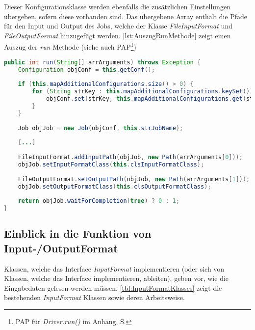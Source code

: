Dieser Konfigurationsklasse werden ebenfalls die zusätzlichen Einstellungen übergeben, sofern diese vorhanden sind. Das übergebene Array enthält die Pfade für den Input und Output des Jobs, welche der Klasse \textit{FileInputFormat} und \textit{FileOutputFormat} hinzugefügt werden. \autoref{lst:AuszugRunMethode} zeigt einen Auszug der \textit{run} Methode (siehe auch \ac{PAP}\footnote{\ac{PAP} für \textit{Driver.run()} im Anhang, S. \pageref{subsec:PAPDriverRun}}) \\

\begin{lstlisting}[language=Java,caption=Auszug der \textit{run()} Methode,label=lst:AuszugRunMethode]
public int run(String[] arrArguments) throws Exception {
	Configuration objConf = this.getConf();
	
	if (this.mapAdditionalConfigurations.size() > 0) {
		for (String strKey : this.mapAdditionalConfigurations.keySet()) {
			objConf.set(strKey, this.mapAdditionalConfigurations.get(strKey));
		}
	}
	
	Job objJob = new Job(objConf, this.strJobName);
	
	[...]
	
	FileInputFormat.addInputPath(objJob, new Path(arrArguments[0]));
	objJob.setInputFormatClass(this.clsInputFormatClass);
	
	FileOutputFormat.setOutputPath(objJob, new Path(arrArguments[1]));
	objJob.setOutputFormatClass(this.clsOutputFormatClass);
	
	return objJob.waitForCompletion(true) ? 0 : 1;
}
\end{lstlisting}

\subsection{Einblick in die Funktion von Input-/OutputFormat}
Klassen, welche das Interface \textit{InputFormat} implementieren (oder sich von Klassen, welche das Interface implementieren, ableiten), geben vor, wie die Eingabedaten gelesen werden müssen. \autoref{tbl:InputFormatKlasses} zeigt die bestehenden \textit{InputFormat} Klassen sowie deren Arbeitsweise.

